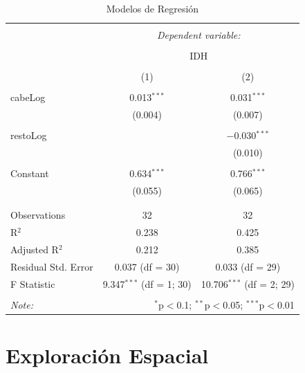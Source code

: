 \documentclass{article}
\begin{document}
\begin{table}[!htbp] \centering 
  \caption{Modelos de Regresión} 
  \label{regresiones} 
\begin{tabular}{@{\extracolsep{5pt}}lcc} 
\\[-1.8ex]\hline 
\hline \\[-1.8ex] 
 & \multicolumn{2}{c}{\textit{Dependent variable:}} \\ 
\cline{2-3} 
\\[-1.8ex] & \multicolumn{2}{c}{IDH} \\ 
\\[-1.8ex] & (1) & (2)\\ 
\hline \\[-1.8ex] 
 cabeLog & 0.013$^{***}$ & 0.031$^{***}$ \\ 
  & (0.004) & (0.007) \\ 
  & & \\ 
 restoLog &  & $-$0.030$^{***}$ \\ 
  &  & (0.010) \\ 
  & & \\ 
 Constant & 0.634$^{***}$ & 0.766$^{***}$ \\ 
  & (0.055) & (0.065) \\ 
  & & \\ 
\hline \\[-1.8ex] 
Observations & 32 & 32 \\ 
R$^{2}$ & 0.238 & 0.425 \\ 
Adjusted R$^{2}$ & 0.212 & 0.385 \\ 
Residual Std. Error & 0.037 (df = 30) & 0.033 (df = 29) \\ 
F Statistic & 9.347$^{***}$ (df = 1; 30) & 10.706$^{***}$ (df = 2; 29) \\ 
\hline 
\hline \\[-1.8ex] 
\textit{Note:}  & \multicolumn{2}{r}{$^{*}$p$<$0.1; $^{**}$p$<$0.05; $^{***}$p$<$0.01} \\ 
\end{tabular} 
\end{table} 
\section{Exploración Espacial}\label{ExpEspa}
\end{document}
